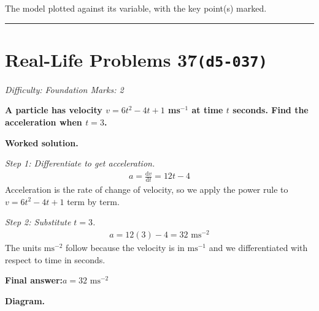 \documentclass[11pt]{article}
\newcommand{\question}[1]{\par\medskip\noindent\textbf{#1}\par}
\begin{document}
\small The model plotted against its variable, with the key point(s) marked.\normalsize

\medskip\hrule

\section*{Real-Life Problems 37\quad\small\texttt{(d5-037)}}
\textit{Difficulty: Foundation \quad\textbar\quad Marks: 2}

\question{A particle has velocity \( v = 6t^2 - 4t + 1 \) ms\(^{-1}\) at time \( t \) seconds. Find the acceleration when \( t = 3 \).}

\textbf{Worked solution.}

\textit{Step 1: Differentiate to get acceleration.}
\[\begin{gathered}
a = \frac{\mathrm{d}v}{\mathrm{d}t} = 12t - 4
\end{gathered}\]
Acceleration is the rate of change of velocity, so we apply the power rule to \( v = 6t^2 - 4t + 1 \) term by term.

\textit{Step 2: Substitute \( t = 3 \).}
\[\begin{gathered}
a = 12(3) - 4 = 32 \text{ ms}^{-2}
\end{gathered}\]
The units \( \text{ms}^{-2} \) follow because the velocity is in \( \text{ms}^{-1} \) and we differentiated with respect to time in seconds.

\begin{answerbox}
\textbf{Final answer:}\quad \(\displaystyle  a = 32 \text{ ms}^{-2} \)
\end{answerbox}
\textbf{Diagram.}
\end{document}
